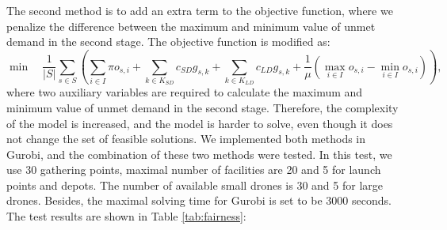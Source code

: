 \documentclass[preprint,review,11pt,authoryear]{elsarticle}
\begin{document}
The second method is to add an extra term to the objective function, where we penalize the difference between the maximum and minimum value of unmet demand in the second stage. The objective function is modified as:
\begin{equation}
    \min \quad \frac{1}{|S|} \sum_{s \in S} \left(\sum_{i \in I} \pi o_{s,i} + \sum_{k \in K_{SD}} c_{SD} g_{s,k} + \sum_{k \in K_{LD}} c_{LD} g_{s,k} + \frac{1}{\mu} \left( \max_{i \in I} o_{s,i} - \min_{i \in I} o_{s,i} \right) \right),
    \label{eq:fairness_objective}
\end{equation}
where two auxiliary variables are required to calculate the maximum and minimum value of unmet demand in the second stage. Therefore, the complexity of the model is increased, and the model is harder to solve, even though it does not change the set of feasible solutions. We implemented both methods in Gurobi, and the combination of these two methods were tested. In this test, we use 30 gathering points, maximal number of facilities are 20 and 5 for launch points and depots. The number of available small drones is 30 and 5 for large drones. Besides, the maximal solving time for Gurobi is set to be 3000 seconds. The test results are shown in Table \ref{tab:fairness}: 
\end{document}
